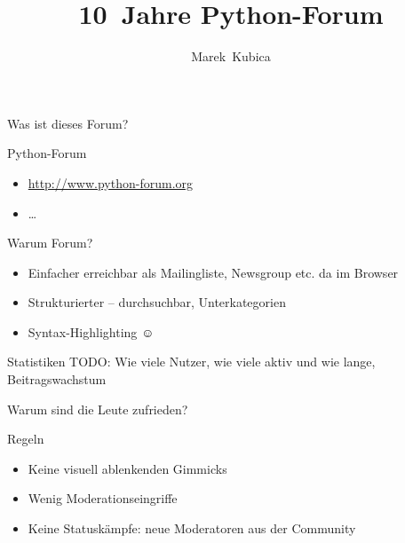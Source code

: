 \documentclass{beamer}
\title{10~Jahre Python-Forum}
\author{Marek~Kubica}
\institute{PyCon DE 2012}
\begin{document}
\setmainfont{Latin Modern Roman}
\setsansfont{Latin Modern Sans}
\setmonofont{Latin Modern Mono}


\begin{frame}{Was ist dieses Forum?}
  \begin{block}{Python-Forum}
    \begin{itemize}
      \item \url{http://www.python-forum.org}
      \item …
    \end{itemize}
  \end{block}
  \begin{block}{Warum Forum?}
    \begin{itemize}
      \item Einfacher erreichbar als Mailingliste, Newsgroup etc. da im Browser
      \item Strukturierter -- durchsuchbar, Unterkategorien
      \item Syntax-Highlighting {\setsansfont{DejaVu Sans}\selectfont ☺}
    \end{itemize}
  \end{block}
\end{frame}

\begin{frame}{Statistiken}
  TODO: Wie viele Nutzer, wie viele aktiv und wie lange, Beitragswachstum
\end{frame}

\begin{frame}{Warum sind die Leute zufrieden?}
  \begin{block}{Regeln}
    \begin{itemize}
      \item Keine visuell ablenkenden Gimmicks
      \item Wenig Moderationseingriffe
      \item Keine Statuskämpfe: neue Moderatoren aus der Community
    \end{itemize}
  \end{block}
\end{frame}
\end{document}
